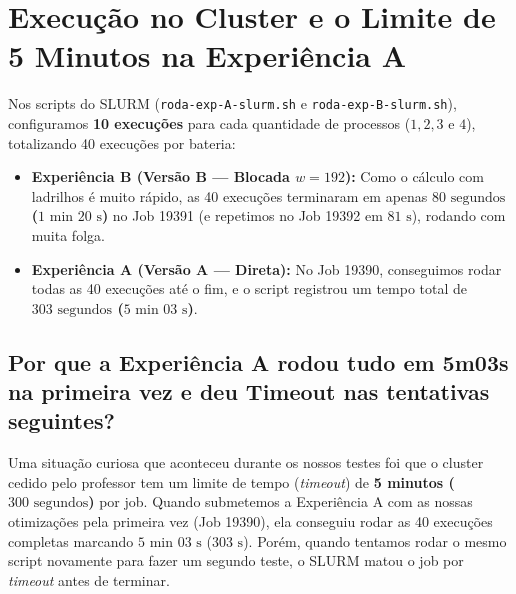 \documentclass[12pt, a4paper, twoside, chapter=TITLE, subsection=TITLE, section=TITLE, subsubsection=TITLE, english, brazil]{abntex2}
\begin{document}
\section{Execução no Cluster e o Limite de 5 Minutos na Experiência A}
Nos scripts do SLURM (\nolinkurl{roda-exp-A-slurm.sh} e \nolinkurl{roda-exp-B-slurm.sh}), configuramos \textbf{10 execuções} para cada quantidade de processos ($1, 2, 3$ e $4$), totalizando 40 execuções por bateria:
\begin{itemize}
    \item \textbf{Experiência B (Versão B --- Blocada $w = 192$):} Como o cálculo com ladrilhos é muito rápido, as 40 execuções terminaram em apenas \textbf{$80\text{ segundos}$ ($1\text{ min }20\text{ s}$)} no Job 19391 (e repetimos no Job 19392 em $81\text{ s}$), rodando com muita folga.
    \item \textbf{Experiência A (Versão A --- Direta):} No Job 19390, conseguimos rodar todas as 40 execuções até o fim, e o script registrou um tempo total de \textbf{$303\text{ segundos}$ ($5\text{ min }03\text{ s}$)}.
\end{itemize}

\subsection{Por que a Experiência A rodou tudo em 5m03s na primeira vez e deu Timeout nas tentativas seguintes?}
Uma situação curiosa que aconteceu durante os nossos testes foi que o cluster cedido pelo professor tem um limite de tempo (\textit{timeout}) de \textbf{5 minutos ($300\text{ segundos}$)} por job. Quando submetemos a Experiência A com as nossas otimizações pela primeira vez (Job 19390), ela conseguiu rodar as 40 execuções completas marcando $5\text{ min }03\text{ s}$ ($303\text{ s}$). Porém, quando tentamos rodar o mesmo script novamente para fazer um segundo teste, o SLURM matou o job por \textit{timeout} antes de terminar.
\end{document}
